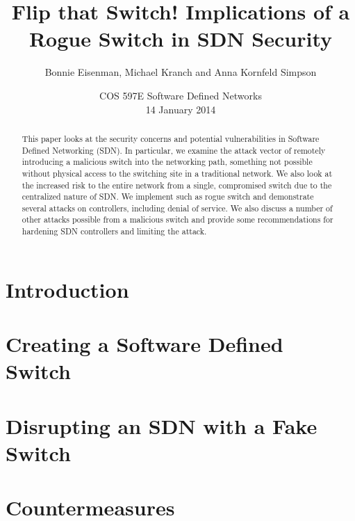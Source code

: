 \documentclass[12pt, letterpaper, twocolumn, twoside]{article}
\title{Flip that Switch! Implications of a Rogue Switch in SDN Security}
\author{Bonnie Eisenman, Michael Kranch and Anna Kornfeld Simpson}
\date{COS 597E Software Defined Networks \\ 14 January 2014}
\begin{document}
\maketitle

\begin{spacing}{1.0}

\begin{abstract}
This paper looks at the security concerns and potential vulnerabilities in Software Defined Networking (SDN). In particular, we examine the attack vector of remotely introducing a malicious switch into the networking path, something not possible without physical access to the switching site in a traditional network. We also look at the increased risk to the entire network from a single, compromised switch due to the centralized nature of SDN. We implement such as rogue switch and demonstrate several attacks on controllers, including denial of service. We also discuss a number of other attacks possible from a malicious switch and provide some recommendations for hardening SDN controllers and limiting the attack.

\end{abstract}

\section{Introduction}


\section{Creating a Software Defined Switch}
\label{fake}


\section{Disrupting an SDN with a Fake Switch}
\label{attacks}


\section{Countermeasures}
\label{countermeasures}



\end{spacing}
\end{document}

